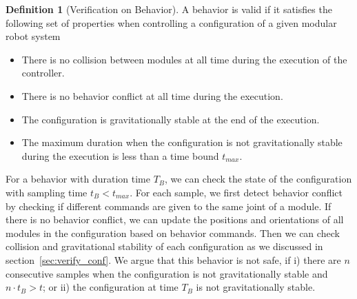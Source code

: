 \documentclass[conference]{IEEEtran}
\theoremstyle{definition}
\newtheorem{definition}{Definition}[section]
\newcommand{\TODO}[1]{ {\bf \textcolor{red}{TODO:} #1 }}
\begin{document}
\begin{definition}[Verification on Behavior]
A behavior is valid if it satisfies the following set of properties when controlling a configuration of a given modular robot system
\begin{itemize}
\item There is no collision between modules at all time during the execution of the controller.
\item There is no behavior conflict at all time during the execution.
\item The configuration is gravitationally stable at the end of the execution.
\item The maximum duration when the configuration is not gravitationally stable during the execution is less than a time bound $t_{max}$.
\end{itemize}
\end{definition}
For a behavior with duration time $T_B$, we can check the state of the configuration with sampling time $t_B<t_{max}$. For each sample, we first detect behavior conflict by checking if different commands are given to the same joint of a module. If there is no behavior conflict, we can update the positions and orientations of all modules in the configuration based on behavior commands. Then we can check collision and gravitational stability of each configuration as we discussed in section~\ref{sec:verify_conf}. We argue that this behavior is not safe, if i) there are $n$ consecutive samples when the configuration is not gravitationally stable and $n\cdot t_B > t$; or ii) the configuration at time $T_B$ is not gravitationally stable.
\end{document}
